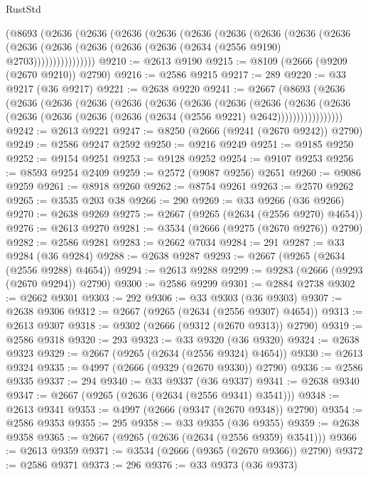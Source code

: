 \begin{lexlean}{RustStd}
\begin{coremodule}
    (@8693
      (@2636
        (@2636
          (@2636
            (@2636
              (@2636
                (@2636
                  (@2636
                    (@2636
                      (@2636
                        (@2636
                          (@2636 (@2636 (@2636 (@2636 (@2634 (@2556 @9190) @2703))))))))))))))))
@9210 := @2613 @9190
@9215 := @8109 (@2666 (@9209 (@2670 @9210)) @2790)
@9216 := @2586 @9215
@9217 := 289
@9220 := @33 @9217 (@36 @9217)
@9221 := @2638 @9220
@9241 := @2667
    (@8693
      (@2636
        (@2636
          (@2636
            (@2636
              (@2636
                (@2636
                  (@2636
                    (@2636
                      (@2636
                        (@2636
                          (@2636
                            (@2636 (@2636 (@2636 (@2636 (@2634 (@2556 @9221) @2642)))))))))))))))))
@9242 := @2613 @9221
@9247 := @8250 (@2666 (@9241 (@2670 @9242)) @2790)
@9249 := @2586 @9247 @2592
@9250 := @9216 @9249
@9251 := @9185 @9250
@9252 := @9154 @9251
@9253 := @9128 @9252
@9254 := @9107 @9253
@9256 := @8593 @9254 @2409
@9259 := @2572 (@9087 @9256) @2651
@9260 := @9086 @9259
@9261 := @8918 @9260
@9262 := @8754 @9261
@9263 := @2570 @9262
@9265 := @3535 @203 @38
@9266 := 290
@9269 := @33 @9266 (@36 @9266)
@9270 := @2638 @9269
@9275 := @2667 (@9265 (@2634 (@2556 @9270) @4654))
@9276 := @2613 @9270
@9281 := @3534 (@2666 (@9275 (@2670 @9276)) @2790)
@9282 := @2586 @9281
@9283 := @2662 @7034
@9284 := 291
@9287 := @33 @9284 (@36 @9284)
@9288 := @2638 @9287
@9293 := @2667 (@9265 (@2634 (@2556 @9288) @4654))
@9294 := @2613 @9288
@9299 := @9283 (@2666 (@9293 (@2670 @9294)) @2790)
@9300 := @2586 @9299
@9301 := @2884 @2738
@9302 := @2662 @9301
@9303 := 292
@9306 := @33 @9303 (@36 @9303)
@9307 := @2638 @9306
@9312 := @2667 (@9265 (@2634 (@2556 @9307) @4654))
@9313 := @2613 @9307
@9318 := @9302 (@2666 (@9312 (@2670 @9313)) @2790)
@9319 := @2586 @9318
@9320 := 293
@9323 := @33 @9320 (@36 @9320)
@9324 := @2638 @9323
@9329 := @2667 (@9265 (@2634 (@2556 @9324) @4654))
@9330 := @2613 @9324
@9335 := @4997 (@2666 (@9329 (@2670 @9330)) @2790)
@9336 := @2586 @9335
@9337 := 294
@9340 := @33 @9337 (@36 @9337)
@9341 := @2638 @9340
@9347 := @2667 (@9265 (@2636 (@2634 (@2556 @9341) @3541)))
@9348 := @2613 @9341
@9353 := @4997 (@2666 (@9347 (@2670 @9348)) @2790)
@9354 := @2586 @9353
@9355 := 295
@9358 := @33 @9355 (@36 @9355)
@9359 := @2638 @9358
@9365 := @2667 (@9265 (@2636 (@2634 (@2556 @9359) @3541)))
@9366 := @2613 @9359
@9371 := @3534 (@2666 (@9365 (@2670 @9366)) @2790)
@9372 := @2586 @9371
@9373 := 296
@9376 := @33 @9373 (@36 @9373)

\end{coremodule}
\end{lexlean}
